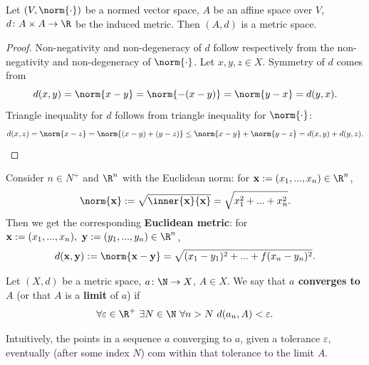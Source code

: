 \begin{proposition}
  Let
    $(V, \norm{\cdot})$ be a normed vector space,
    $A$ be an affine space over $V$,
    $d \colon A \times A \to \R$ be the induced metric.
  Then $(A, d)$ is a metric space.
\end{proposition}
\begin{proof}
  Non-negativity and non-degeneracy of $d$ follow respectively from
  the non-negativity and non-degeneracy of $\norm{\cdot}$.
  Let $x, y, z \in X$.
  Symmetry of $d$ comes from
  \begin{equation}
    d(x, y) = \norm{x - y} = \norm{- (x - y)} = \norm{y - x} = d(y, x).
  \end{equation}
  Triangle inequality for $d$ follows from triangle inequality for
  $\norm{\cdot}$:
  \begin{equation}
    d(x, z)
    = \norm{x - z}
    = \norm{(x - y) + (y - z)}
    \leq \norm{x - y} + \norm{y - z}
    = d(x, y) + d(y, z).
  \end{equation}
\end{proof}
\begin{example}
  Consider $n \in N^+$ and $\R^n$ with the Euclidean norm:
  for ${\bf x} := (x_1, ..., x_n) \in \R^n$,
  \begin{equation}
    \norm{\bf x}
    := \sqrt{\inner{\bf x}{\bf x}}
    = \sqrt{x_1^2 + ... + x_n^2}.
  \end{equation}
  Then we get the corresponding \textbf{Euclidean metric}:
  for ${\bf x} := (x_1, ..., x_n),\ {\bf y} := (y_1, ..., y_n) \in \R^n$,
  \begin{equation}
    d({\bf x}, {\bf y})
    := \norm{{\bf x} - {\bf y}}
    = \sqrt{(x_1 - y_1)^2 + ... +f (x_n - y_n)^2}.
  \end{equation}
\end{example}
\begin{definition}
  Let
    $(X, d)$ be a metric space,
    $a \colon \N \to X$,
    $A \in X$.
  We say that \textbf{$a$ converges to $A$}
  (or that $A$ is a \textbf{limit} of $a$) if
  \begin{equation}
    \forall \varepsilon \in \R^+\
      \exists N \in \N\
        \forall n > N\
          d(a_n, A) < \varepsilon.
  \end{equation}
\end{definition}
\begin{remark}
  Intuitively, the points in a sequence $a$ converging to $a$, given a tolerance
  $\varepsilon$, eventually (after some index $N$) com within that tolerance
  to the limit $A$.
\end{remark}
